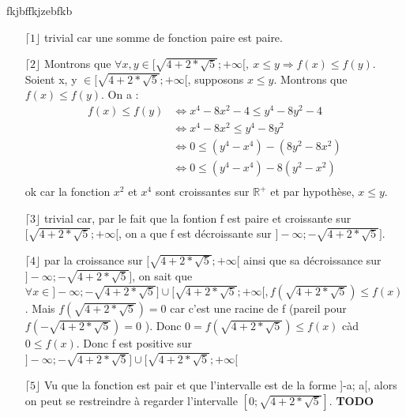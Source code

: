 fkjbffkjzebfkb\documentclass[a4paper, 12pt]{article}
\begin{document}
\begin{itemize}
	\item[\(\lceil 1 \rfloor\)] trivial car une somme de fonction paire est paire.
	\item[\(\lceil 2 \rfloor\)] Montrons que \( \forall x, y \in [ \sqrt{4 + 2 * \sqrt{5}} ; +\infty [, ~ x \leq y \Rightarrow f(x) \leq f(y) \). \newline
	Soient x, y \( \in [ \sqrt{4 + 2 * \sqrt{5}} ; +\infty [ \), supposons \( x \leq y \). Montrons que \( f(x) \leq f(y) \). \newline On a :
	\begin{align*}
		f(x) \leq f(y) &\Leftrightarrow x^4 - 8x^2 - 4 \leq y^4 - 8y^2 - 4 \\
		&\Leftrightarrow x^4 - 8x^2 \leq y^4 - 8y^2 \\
		&\Leftrightarrow 0 \leq (y^4 - x^4) - (8y^2 - 8x^2) \\
		&\Leftrightarrow 0 \leq (y^4 - x^4) - 8(y^2 - x^2) \\
	\end{align*}
	ok car la fonction \( x^2 \) et \( x^4 \) sont croissantes sur \( \mathbb{R}^{+} \) et par hypothèse, \( x \leq y \).	 
	\item[\(\lceil 3 \rfloor\)] trivial car, par le fait que la fontion f est paire et croissante sur \( [ \sqrt{4 + 2 * \sqrt{5}} ; +\infty [ \), on a que f est décroissante sur \( ] -\infty ; -\sqrt{4 + 2 * \sqrt{5}} ] \).
	\item[\(\lceil 4 \rfloor\)] par la croissance sur \( [ \sqrt{4 + 2 * \sqrt{5}} ; +\infty [ \) ainsi que sa décroissance sur \( ] -\infty ; -\sqrt{4 + 2 * \sqrt{5}} ] \), on sait que \( \forall x \in ] -\infty ; -\sqrt{4 + 2 * \sqrt{5}} ] \cup [ \sqrt{4 + 2 * \sqrt{5}} ; +\infty [, f \left( \sqrt{4 + 2 * \sqrt{5}}\right) \leq f \left( x \right) \). Mais \( f \left( \sqrt{4 + 2 * \sqrt{5}} \right) = 0 \) car c'est une racine de f (pareil pour \( f \left( - \sqrt{4 + 2 * \sqrt{5}} \right) = 0 \) ). \newline
	Donc \( 0 = f \left( \sqrt{4 + 2 * \sqrt{5}} \right) \leq f \left( x \right) \) càd \( 0 \leq f \left( x \right) \). Donc f est positive sur \( ] -\infty ; -\sqrt{4 + 2 * \sqrt{5}} ] \cup [ \sqrt{4 + 2 * \sqrt{5}} ; +\infty [ \)
	\item[\(\lceil 5 \rfloor\)] Vu que la fonction est pair et que l'intervalle est de la forme ]-a; a[, alors on peut se restreindre à regarder l'intervalle \( [ 0 ; \sqrt{4 + 2 * \sqrt{5}} ] \).
	\newline \textbf{TODO}
	
\end{itemize}
\end{document}
